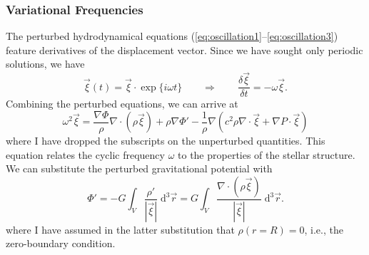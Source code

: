 
\subsubsection*{Variational Frequencies}
The perturbed hydrodynamical equations  (\ref{eq:oscillation1}--\ref{eq:oscillation3}) feature derivatives of the displacement vector. 
Since we have sought only periodic solutions, we have
\begin{equation}
    \vec\xi(t)
    =
    \vec\xi\cdot\exp\{i\omega t\}
    \qquad \Rightarrow \qquad
    \frac{\delta\vec\xi}{\delta t}
    =
    -\omega\vec\xi.
\end{equation}
Combining the perturbed equations, we can arrive at 
\begin{equation} \label{eq:first-omega}
    \omega^2 \vec\xi
    =
    \frac{\nabla \Phi}{\rho}
    \nabla \cdot \left(
        \rho \vec \xi 
    \right)
    +
    \rho \nabla \Phi'
    -
    \frac{1}{\rho}\nabla \left(
        c^2 \rho \nabla \cdot \vec \xi
        +
        \nabla P \cdot \vec \xi
    \right)
\end{equation}
where I have dropped the subscripts on the unperturbed quantities. 
This equation relates the cyclic frequency $\omega$ to the properties of the stellar structure. 
We can substitute the perturbed gravitational potential with 
\begin{equation}
    \Phi'
    =
    -G
    \int_V
        \frac{\rho'}{|\vec\xi|}%
    \;\text{d}^3 \vec r
    =
    G \int_V
        \frac{\nabla%
            \cdot \left(
                \rho%
                \vec\xi%
            \right)}{|\vec\xi|}%
    \;\text{d}^3 \vec{r}.
\end{equation}
where I have assumed in the latter substitution that ${\rho(r=R)=0}$, i.e., the zero-boundary condition. %
